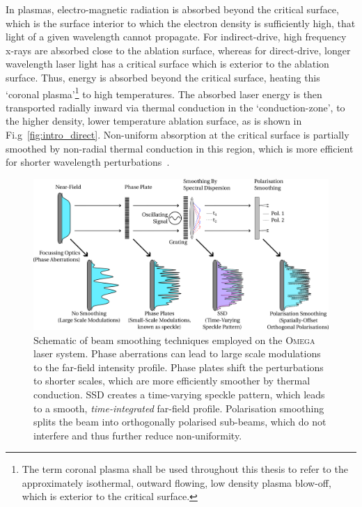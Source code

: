 In plasmas, electro-magnetic radiation is absorbed beyond the critical surface, which is the surface interior to which the electron density is sufficiently high, that light of a given wavelength cannot propagate.
For indirect-drive, high frequency x-rays are absorbed close to the ablation surface, whereas for direct-drive, longer wavelength laser light has a critical surface which is exterior to the ablation surface.
Thus, energy is absorbed beyond the critical surface, heating this `coronal plasma'\footnote{The term coronal plasma shall be used throughout this thesis to refer to the approximately isothermal, outward flowing, low density plasma blow-off, which is exterior to the critical surface.} to high temperatures.
The absorbed laser energy is then transported radially inward via thermal conduction in the `conduction-zone', to the higher density, lower temperature ablation surface, as is shown in Fi.g~\ref{fig:intro_direct}.
Non-uniform absorption at the critical surface is partially smoothed by non-radial thermal conduction in this region, which is more efficient for shorter wavelength perturbations~\cite{bodner_critical_1981}.

\begin{figure}[t!]
    \includegraphics[width=\linewidth]{Introduction/Images/SmoothingOptics.png}
    \centering
    \caption{Schematic of beam smoothing techniques employed on the \textsc{Omega} laser system.
    Phase aberrations can lead to large scale modulations to the far-field intensity profile.
    Phase plates shift the perturbations to shorter scales, which are more efficiently smoother by thermal conduction.
    \ac{SSD} creates a time-varying speckle pattern, which leads to a smooth, \textit{time-integrated} far-field profile.
    Polarisation smoothing splits the beam into orthogonally polarised sub-beams, which do not interfere and thus further reduce non-uniformity.
    }%
    \label{fig:intro_SmoothingOptics}
\end{figure}

